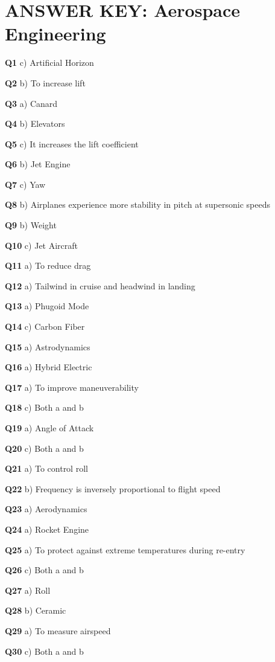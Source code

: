 \section{ANSWER KEY: Aerospace Engineering}

\textbf{Q1} c) Artificial Horizon\par
\textbf{Q2} b) To increase lift\par
\textbf{Q3} a) Canard\par
\textbf{Q4} b) Elevators\par
\textbf{Q5} c) It increases the lift coefficient\par
\textbf{Q6} b) Jet Engine\par
\textbf{Q7} c) Yaw\par
\textbf{Q8} b) Airplanes experience more stability in pitch at supersonic speeds\par
\textbf{Q9} b) Weight\par
\textbf{Q10} c) Jet Aircraft\par
\textbf{Q11} a) To reduce drag\par
\textbf{Q12} a) Tailwind in cruise and headwind in landing\par
\textbf{Q13} a) Phugoid Mode\par
\textbf{Q14} c) Carbon Fiber\par
\textbf{Q15} a) Astrodynamics\par
\textbf{Q16} a) Hybrid Electric\par
\textbf{Q17} a) To improve maneuverability\par
\textbf{Q18} c) Both a and b\par
\textbf{Q19} a) Angle of Attack\par
\textbf{Q20} c) Both a and b\par
\textbf{Q21} a) To control roll\par
\textbf{Q22} b) Frequency is inversely proportional to flight speed\par
\textbf{Q23} a) Aerodynamics\par
\textbf{Q24} a) Rocket Engine\par
\textbf{Q25} a) To protect against extreme temperatures during re-entry\par
\textbf{Q26} c) Both a and b\par
\textbf{Q27} a) Roll\par
\textbf{Q28} b) Ceramic\par
\textbf{Q29} a) To measure airspeed\par
\textbf{Q30} c) Both a and b\par
